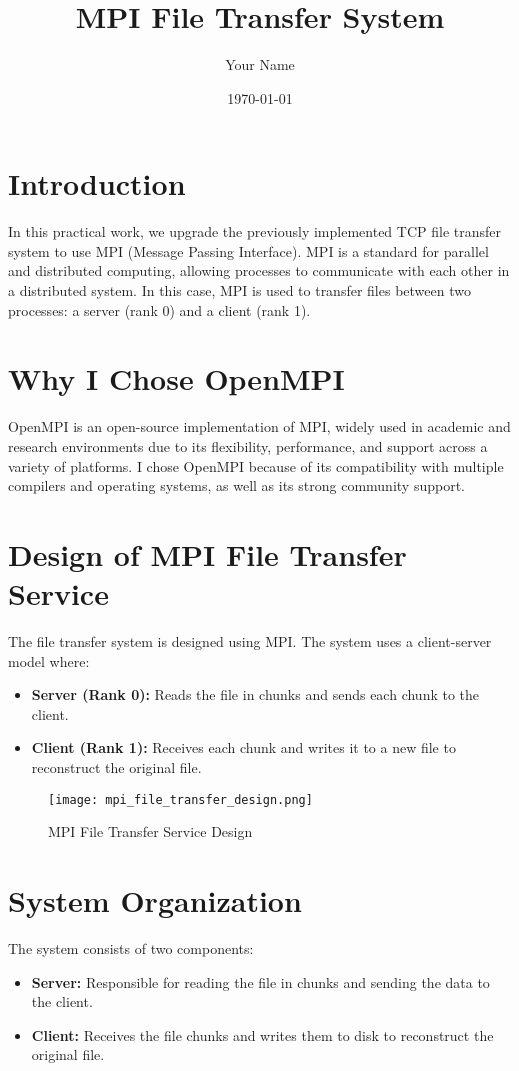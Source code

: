 \documentclass{article}
\title{MPI File Transfer System}
\author{Your Name}
\date{\today}
\begin{document}
\maketitle

\section{Introduction}
In this practical work, we upgrade the previously implemented TCP file transfer system to use MPI (Message Passing Interface). MPI is a standard for parallel and distributed computing, allowing processes to communicate with each other in a distributed system. In this case, MPI is used to transfer files between two processes: a server (rank 0) and a client (rank 1).

\section{Why I Chose OpenMPI}
OpenMPI is an open-source implementation of MPI, widely used in academic and research environments due to its flexibility, performance, and support across a variety of platforms. I chose OpenMPI because of its compatibility with multiple compilers and operating systems, as well as its strong community support.

\section{Design of MPI File Transfer Service}
The file transfer system is designed using MPI. The system uses a client-server model where:
\begin{itemize}
    \item \textbf{Server (Rank 0):} Reads the file in chunks and sends each chunk to the client.
    \item \textbf{Client (Rank 1):} Receives each chunk and writes it to a new file to reconstruct the original file.
\end{itemize}

\begin{figure}[h!]
\centering
\texttt{[image: mpi\_file\_transfer\_design.png]}
\caption{MPI File Transfer Service Design}
\end{figure}

\section{System Organization}
The system consists of two components:
\begin{itemize}
    \item \textbf{Server:} Responsible for reading the file in chunks and sending the data to the client.
    \item \textbf{Client:} Receives the file chunks and writes them to disk to reconstruct the original file.
\end{itemize}
\end{document}
